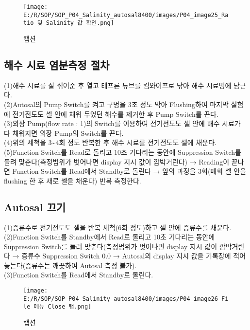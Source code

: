 \documentclass[
]{book}
\begin{document}
\begin{figure}
\centering
\texttt{[image: E:/R/SOP/SOP\_P04\_Salinity\_autosal8400/images/P04\_image25\_Ratio 및 Salinity 값 확인.png]}
\caption{캡션}
\end{figure}

\hypertarget{uxd574uxc218-uxc2dcuxb8cc-uxc5fcuxbd84uxce21uxc815-uxc808uxcc28}{%
\subsection{해수 시료 염분측정 절차}\label{uxd574uxc218-uxc2dcuxb8cc-uxc5fcuxbd84uxce21uxc815-uxc808uxcc28}}

(1)해수 시료를 잘 섞어준 후 열고 테프론 튜브를 킴와이프로 닦아 해수 시료병에 담근다.\\
(2)Autosal의 Pump Switch를 켜고 구멍을 3초 정도 막아 Flushing하여 마지막 실험에 전기전도도 셀 안에 채워 두었던 해수를 제거한 후 Pump Switch를 끈다.\\
(3)외장 Pump(flow rate : 1)의 Switch를 이용하여 전기전도도 셀 안에 해수 시료가 다 채워지면 외장 Pump의 Switch를 끈다.\\
(4)위의 세척을 3\textasciitilde4회 정도 반복한 후 해수 시료를 전기전도도 셀에 채운다.\\
(5)Function Switch를 Read로 돌리고 10초 기다리는 동안에 Suppression Switch를 돌려 맞춘다(측정범위가 벗어나면 display 지시 값이 깜박거린다) → Reading이 끝나면 Function Switch를 Read에서 Standby로 돌린다 → 앞의 과정을 3회(매회 셀 안을 flushing 한 후 새로 셀을 채운다) 반복 측정한다.

\hypertarget{autosal-uxb044uxae30}{%
\subsection{Autosal 끄기}\label{autosal-uxb044uxae30}}

(1)증류수로 전기전도도 셀을 반복 세척(6회 정도)하고 셀 안에 증류수를 채운다.\\
(2)Function Switch를 Standby에서 Read로 돌리고 10초 기다리는 동안에 Suppression Switch를 돌려 맞춘다(측정범위가 벗어나면 display 지시 값이 깜박거린다 → 증류수 Suppression Switch 0.0 → Autosal의 display 지시 값을 기록장에 적어 놓는다(증류수는 깨끗하여 Autosal 측정 불가).\\
(3)Function Switch를 Read에서 Standby로 돌린다.

\begin{figure}
\centering
\texttt{[image: E:/R/SOP/SOP\_P04\_Salinity\_autosal8400/images/P04\_image26\_File 메뉴 Close 탭.png]}
\caption{캡션}
\end{figure}
\end{document}
